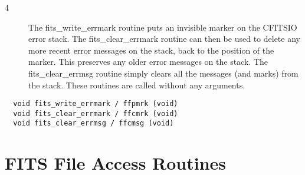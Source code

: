 \documentclass[11pt]{book}
\begin{document}
\begin{description}
\item[4 ]The fits\_write\_errmark routine puts an invisible marker on the
   CFITSIO error stack.  The fits\_clear\_errmark routine can then be
   used to delete any more recent error messages on the stack, back to
   the position of the marker.  This preserves any older error messages
   on the stack.  The fits\_clear\_errmsg routine simply clears all the
   messages (and marks) from the stack.  These routines are called
   without any arguments.
\label{ffpmrk}  \label{ffcmsg}
\end{description}

\begin{verbatim}
  void fits_write_errmark / ffpmrk (void)
  void fits_clear_errmark / ffcmrk (void)
  void fits_clear_errmsg / ffcmsg (void)
\end{verbatim}


\section{FITS File Access Routines}
\end{document}
